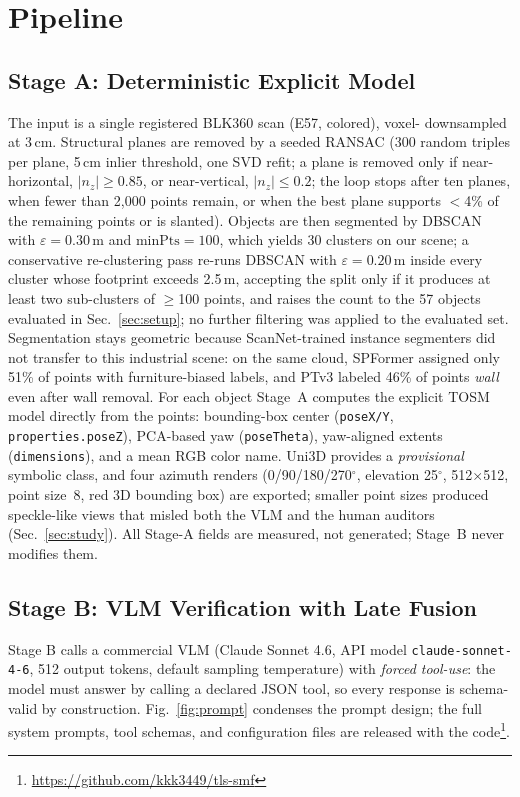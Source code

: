 \documentclass[conference]{IEEEtran}
\begin{document}
\section{Pipeline}

\subsection{Stage A: Deterministic Explicit Model}
\label{sec:stagea}
The input is a single registered BLK360 scan (E57, colored), voxel-
downsampled at 3\,cm. Structural planes are removed by a seeded RANSAC
(300 random triples per plane, 5\,cm inlier threshold, one SVD refit;
a plane is removed only if near-horizontal, $|n_z|\ge0.85$, or
near-vertical, $|n_z|\le0.2$; the loop stops after ten planes, when fewer
than 2{,}000 points remain, or when the best plane supports $<$4\% of the
remaining points or is slanted). Objects are then segmented by
DBSCAN~\cite{ester1996} with $\varepsilon=0.30$\,m and
$\mathrm{minPts}=100$, which yields 30 clusters on our scene; a
conservative re-clustering pass re-runs DBSCAN with
$\varepsilon=0.20$\,m inside every cluster whose footprint exceeds
2.5\,m, accepting the split only if it produces at least two sub-clusters
of $\ge$100 points, and raises the count to the 57 objects evaluated in
Sec.~\ref{sec:setup}; no further filtering was applied to the evaluated
set. Segmentation stays
geometric because ScanNet-trained instance segmenters did not transfer to
this industrial scene: on the same cloud, SPFormer assigned only 51\% of
points with furniture-biased labels, and PTv3 labeled 46\% of points
\emph{wall} even after wall removal. For each object Stage~A
computes the explicit TOSM model directly from the points: bounding-box
center (\texttt{poseX/Y}, \texttt{properties.poseZ}), PCA-based yaw
(\texttt{poseTheta}), yaw-aligned extents (\texttt{dimensions}), and a mean
RGB color name. Uni3D provides a \emph{provisional} symbolic class, and four
azimuth renders (0/90/180/270$^{\circ}$, elevation 25$^{\circ}$,
512$\times$512, point size~8, red 3D bounding box) are exported; smaller
point sizes produced speckle-like views that misled both the VLM and the
human auditors (Sec.~\ref{sec:study}). All Stage-A fields are measured,
not generated; Stage~B never modifies them.

\subsection{Stage B: VLM Verification with Late Fusion}
\label{sec:stageb}
Stage B calls a commercial VLM (Claude Sonnet 4.6, API model
\texttt{claude-sonnet-4-6}, 512 output tokens, default sampling
temperature) with \emph{forced tool-use}: the model must answer by calling
a declared JSON tool, so every response is schema-valid by construction.
Fig.~\ref{fig:prompt} condenses the prompt design; the full system prompts,
tool schemas, and configuration files are released with the
code\footnote{\url{https://github.com/kkk3449/tls-smf}}.
\end{document}
